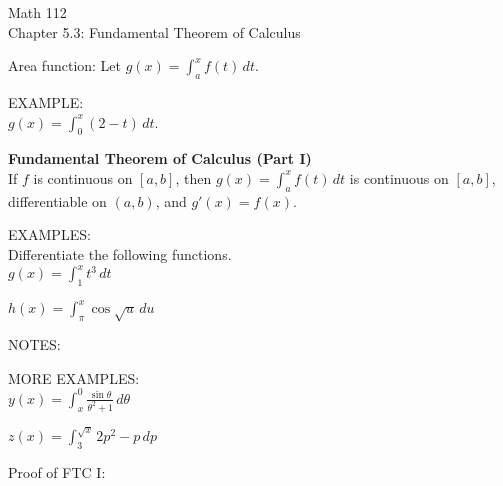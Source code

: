 \documentclass[11pt]{article}
\begin{document}
\begin{center}
\Large
\rm{Math 112}
\\
\rm{Chapter 5.3:  Fundamental Theorem of Calculus}
\\
\end{center}
\vspace{0.2in}

Area function:  Let $g(x) = \int_a^xf(t)\, dt$.


\vspace{2.2in}


EXAMPLE: \\

$g(x) = \int_0^x(2-t)\, dt$.

\vspace{1.5in}

\pagebreak

{\bf Fundamental Theorem of Calculus (Part I)} \\

If $f$ is continuous on $[a,b]$, then $g(x) = \int_a^xf(t)\, dt$ is continuous on $[a,b]$,
differentiable on $(a,b)$, and $g'(x) = f(x)$.


\vspace{1.5in}

EXAMPLES:\\

Differentiate the following functions.\\

$g(x) = \int_1^x t^3\,dt$

\vspace{0.5in}


$h(x) = \int_{\pi}^x \cos{\sqrt{u}}\,du$


\vspace{0.5in}


NOTES:


\vspace{2in}

MORE EXAMPLES:\\

$y(x) = \int_{x}^0 \frac{\sin{\theta}}{\theta^2+1}\,d\theta$


\pagebreak

$z(x) = \int_{3}^{\sqrt{x}} 2p^2-p\,dp$

\vspace{2in}


Proof of FTC I: \\


\vspace{3.5in}
\end{document}
